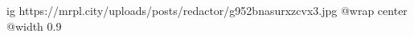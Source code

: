  
 
 
 
 

\ifcmt
  ig https://mrpl.city/uploads/posts/redactor/g952bnasurxzcvx3.jpg
  @wrap center
  @width 0.9
\fi
